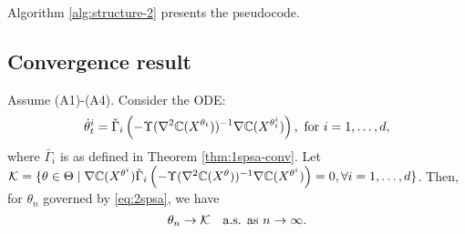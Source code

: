 Algorithm \ref{alg:structure-2} presents the pseudocode.  

\subsection{Convergence result}
\begin{theorem}
\label{thm:2spsa}
Assume (A1)-(A4). 
Consider the ODE: 
$$
\dot\theta^{i}_t = \check\Gamma_{i}\left( - \Upsilon(\nabla^2 \mathbb{C}(X^{\theta_t}))^{-1} \nabla \mathbb{C}(X^{\theta^{i}_t}) \right), \text { for }i=1,\dots,d,$$
where 
$\bar\Gamma_{i}$ is as defined in Theorem \ref{thm:1spsa-conv}. Let $\mathcal{K} = \{\theta \in \Theta \mid
\nabla \mathbb{C}(X^{\theta^{i}})  \check\Gamma_{i}\left(-\Upsilon(\nabla^2 \mathbb{C}(X^{\theta}))^{-1} \nabla \mathbb{C}(X^{\theta^{i}})\right)
=0, \forall i=1,\ldots,d\}$. Then, for $\theta_n$ governed by \eqref{eq:2spsa}, 
we have
$$\theta_n \rightarrow \mathcal{K}  \text{~~ a.s. as } n\rightarrow \infty.$$ 
\end{theorem}
